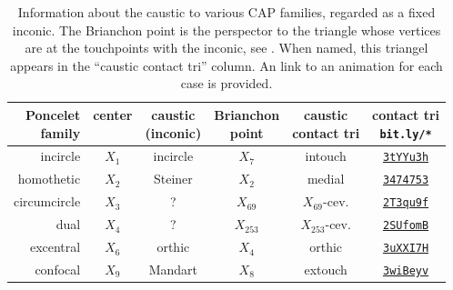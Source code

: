 \begin{table}
\centering
\begin{tabular}{|r|c|c|c|c|c|}
\hline
\makecell[rc]{Poncelet\\family} &
center &
\makecell[cc]{caustic\\(inconic)} & 
\makecell[cc]{Brianchon\\point} &
\makecell[cc]{caustic\\contact tri} &
\makecell[cc]{contact tri\\ \texttt{bit.ly/*}} \\
\hline
incircle & $X_1$ &  incircle & $X_7$ & intouch & \href{https://bit.ly/3tYYu3h}{\texttt{3tYYu3h}}\\
homothetic & $X_2$ & Steiner & $X_2$ & medial & \href{https://bit.ly/3474753}{\texttt{3474753}} \\
circumcircle & $X_3$ & ? & $X_{69}$ & $X_{69}$-cev. & \href{https://bit.ly/2T3qu9f}{\texttt{2T3qu9f}}\\
dual & $X_4$ & ? & $X_{253}$ & $X_{253}$-cev. & \href{https://bit.ly/2SUfomB}{\texttt{2SUfomB}} \\
excentral & $X_6$ & orthic & $X_4$ & orthic & \href{https://bit.ly/3uXXI7H}{\texttt{3uXXI7H}}\\
confocal & $X_9$ & Mandart & $X_8$ & extouch & \href{https://bit.ly/3wiBeyv}{\texttt{3wiBeyv}} \\
\hline
\end{tabular}
\caption{Information about the caustic to various CAP families, regarded as a fixed inconic. The Brianchon point is the perspector to the triangle whose vertices are at the touchpoints with the inconic, see \cite[Brianchon point]{mw}. When named, this triangel appears in the ``caustic contact tri'' column. An link to an animation for each case is provided.}
\label{tab:03-inconics}
\end{table}


